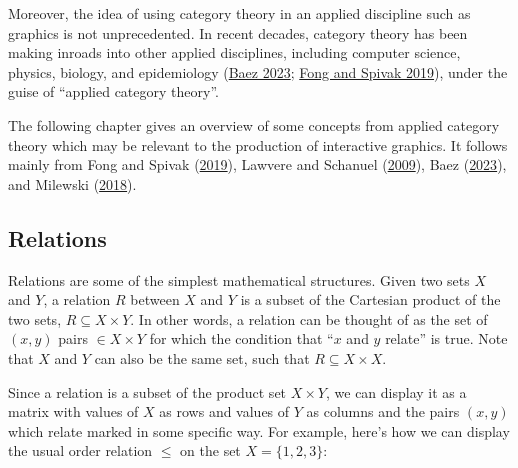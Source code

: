 \documentclass[
]{book}
\theoremstyle{definition}
\theoremstyle{definition}
\theoremstyle{definition}
\theoremstyle{definition}
\theoremstyle{remark}
\begin{document}
Moreover, the idea of using category theory in an applied discipline such as graphics is not unprecedented. In recent decades, category theory has been making inroads into other applied disciplines, including computer science, physics, biology, and epidemiology (\protect\hyperlink{ref-baez2023}{Baez 2023}; \protect\hyperlink{ref-fong2019}{Fong and Spivak 2019}), under the guise of ``applied category theory''.

The following chapter gives an overview of some concepts from applied category theory which may be relevant to the production of interactive graphics. It follows mainly from Fong and Spivak (\protect\hyperlink{ref-fong2019}{2019}), Lawvere and Schanuel (\protect\hyperlink{ref-lawvere2009}{2009}), Baez (\protect\hyperlink{ref-baez2023}{2023}), and Milewski (\protect\hyperlink{ref-milewski2018}{2018}).

\hypertarget{relations}{%
\subsection{Relations}\label{relations}}

Relations are some of the simplest mathematical structures. Given two sets \(X\) and \(Y\), a relation \(R\) between \(X\) and \(Y\) is a subset of the Cartesian product of the two sets, \(R \subseteq X \times Y\). In other words, a relation can be thought of as the set of \((x, y)\) pairs \(\in X \times Y\) for which the condition that ``\(x\) and \(y\) relate'' is true. Note that \(X\) and \(Y\) can also be the same set, such that \(R \subseteq X \times X\).

Since a relation is a subset of the product set \(X \times Y\), we can display it as a matrix with values of \(X\) as rows and values of \(Y\) as columns and the pairs \((x, y)\) which relate marked in some specific way. For example, here's how we can display the usual order relation \(\leq\) on the set \(X = \{ 1, 2, 3 \}\):
\end{document}
